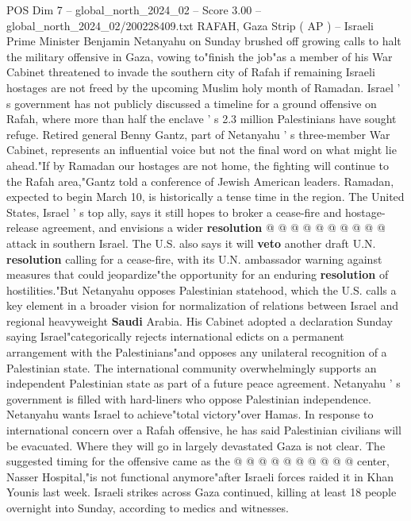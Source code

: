 \begin{textsample}{POS Dim 7 – global\_north\_2024\_02 – Score 3.00 – global\_north\_2024\_02/200228409.txt}  \label{ex:f7_pos_164}
RAFAH, Gaza Strip ( AP ) -- Israeli Prime Minister Benjamin Netanyahu on Sunday brushed off growing calls to halt the military offensive in Gaza, vowing to"finish the job"as a member of his War Cabinet threatened to invade the southern city of Rafah if remaining Israeli hostages are not freed by the upcoming Muslim holy month of Ramadan.
Israel ' s government has not publicly discussed a timeline for a ground offensive on Rafah, where more than half the enclave ' s 2.3 million Palestinians have sought refuge.
Retired general Benny Gantz, part of Netanyahu ' s three-member War Cabinet, represents an influential voice but not the final word on what might lie ahead."If by Ramadan our hostages are not home, the fighting will continue to the Rafah area,"Gantz told a conference of Jewish American leaders.
Ramadan, expected to begin March 10, is historically a tense time in the region.
The United States, Israel ' s top ally, says it still hopes to broker a cease-fire and hostage-release agreement, and envisions a wider \textbf{resolution} @ @ @ @ @ @ @ @ @ @ attack in southern Israel.
The U.S. also says it will \textbf{veto} another draft U.N. \textbf{resolution} calling for a cease-fire, with its U.N. ambassador warning against measures that could jeopardize"the opportunity for an enduring \textbf{resolution} of hostilities."But Netanyahu opposes Palestinian statehood, which the U.S. calls a key element in a broader vision for normalization of relations between Israel and regional heavyweight \textbf{Saudi} Arabia.
His Cabinet adopted a declaration Sunday saying Israel"categorically rejects international edicts on a permanent arrangement with the Palestinians"and opposes any unilateral recognition of a Palestinian state.
The international community overwhelmingly supports an independent Palestinian state as part of a future peace agreement.
Netanyahu ' s government is filled with hard-liners who oppose Palestinian independence.
Netanyahu wants Israel to achieve"total victory"over Hamas.
In response to international concern over a Rafah offensive, he has said Palestinian civilians will be evacuated.
Where they will go in largely devastated Gaza is not clear.
The suggested timing for the offensive came as the @ @ @ @ @ @ @ @ @ @ center, Nasser Hospital,"is not functional anymore"after Israeli forces raided it in Khan Younis last week.
Israeli strikes across Gaza continued, killing at least 18 people overnight into Sunday, according to medics and witnesses.

\end{textsample}
